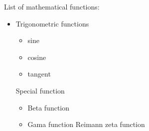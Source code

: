 \documentclass{article}
\begin{document}
List of mathematical functions:
\begin{itemize}
\item Trigonometric functions
\begin{itemize}
    \item sine
    \item cosine
    \item tangent
\end{itemize}
\itme Special function
\begin{itemize}
    \item Beta function
    \item Gama function
    \itme Reimann zeta function
\end{itemize}
\end{itemize}
\end{document}
